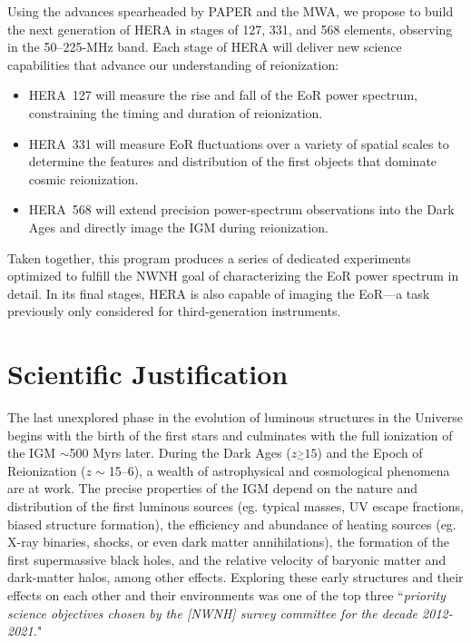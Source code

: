 \documentclass[preprint]{aastex}
\newcommand{\simgt}{\stackrel{>}{_{\sim}}}
\begin{document}
Using the advances spearheaded by
PAPER and the MWA,
we propose to build the next generation of HERA in stages of 127, 331, and 568 elements,
observing in the 
50--225-MHz band.
Each stage of HERA will deliver new science capabilities that advance our
understanding of reionization:
\vspace{-4pt}
\begin{itemize}\setlength{\parskip}{0pt}\itemsep0pt
\item HERA~127 will measure the rise and fall of the EoR power
spectrum, constraining the timing and duration of reionization.
\item HERA~331 will measure EoR fluctuations over a variety of
spatial scales to determine the features and distribution of
the first objects that dominate cosmic reionization.
\item HERA~568 will extend precision power-spectrum observations
into the Dark Ages and 
directly image the IGM during reionization.
\end{itemize}
\vspace{-4pt}
{ \setlength{\parindent}{0cm}
Taken together, this program produces a series of dedicated experiments
optimized to fulfill the NWNH goal of characterizing the EoR power spectrum
in detail. In its final stages, HERA
is also
capable of imaging the EoR---a task previously only considered for
third-generation instruments.}


\vspace{-0.25in}
\section{Scientific Justification}
\label{SJsec}

The last unexplored phase in the evolution of luminous structures in the
Universe begins with the birth of the first stars and culminates with the full
ionization of the IGM $\sim$500 Myrs later.  During the Dark Ages
($z\simgt15$) and the Epoch of Reionization ($z\sim$15--6), a wealth of
astrophysical and cosmological phenomena are at work.  The precise properties
of the IGM depend on the nature and distribution of the first luminous sources
(eg. typical masses, UV escape fractions, biased structure formation), the
efficiency and abundance of heating sources (eg.  X-ray binaries, shocks, or
even dark matter annihilations), the formation of the first supermassive black
holes, and the relative velocity of baryonic matter and dark-matter halos,
among other effects. 
Exploring these early structures and their effects on each other and 
their environments was one of the top three 
``{\it priority science objectives chosen by the [NWNH] survey committee for the
decade 2012-2021.}"
\end{document}
